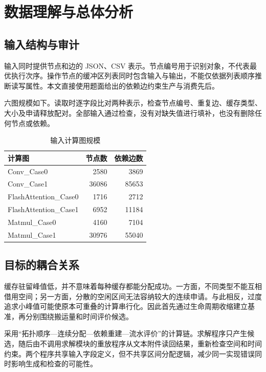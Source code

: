 \section{数据理解与总体分析}
\subsection{输入结构与审计}
输入同时提供节点和边的 JSON、CSV 表示。节点编号用于识别对象，不代表最优执行次序。操作节点的缓冲区列表同时包含输入与输出，不能仅依据列表顺序推断读写属性。本文直接使用题面给出的依赖边约束生产与消费先后。

六图规模如下。读取时逐字段比对两种表示，检查节点编号、重复边、缓存类型、大小及申请释放配对。全部输入通过检查，没有对缺失值进行填补，也没有删除任何节点或依赖。
\begin{table}[H]\centering\caption{输入计算图规模}\small
\begin{tabular}{lrr}\toprule 计算图 & 节点数 & 依赖边数\\\midrule
Conv\_Case0 & 2580 & 3869\\
Conv\_Case1 & 36086 & 85653\\
FlashAttention\_Case0 & 1716 & 2712\\
FlashAttention\_Case1 & 6952 & 11184\\
Matmul\_Case0 & 4160 & 7104\\
Matmul\_Case1 & 30976 & 55040\\\bottomrule
\end{tabular}\end{table}

\subsection{目标的耦合关系}
缓存驻留峰值低，并不意味着每种缓存都能分配成功。一方面，不同类型不能互相借用空间；另一方面，分散的空闲区间无法容纳较大的连续申请。与此相反，过度追求小峰值可能使原本可重叠的计算串行化。因此首先通过生命周期收缩建立基准，再分别围绕搬运量和时间评价候选。

采用“拓扑顺序—连续分配—依赖重建—流水评价”的计算链。求解程序只产生候选，随后由不调用求解模块的重放程序从文本附件读回结果，重新检查空间和时间约束。两个程序共享输入字段定义，但不共享区间分配逻辑，减少同一实现错误同时影响生成和检查的可能性。
